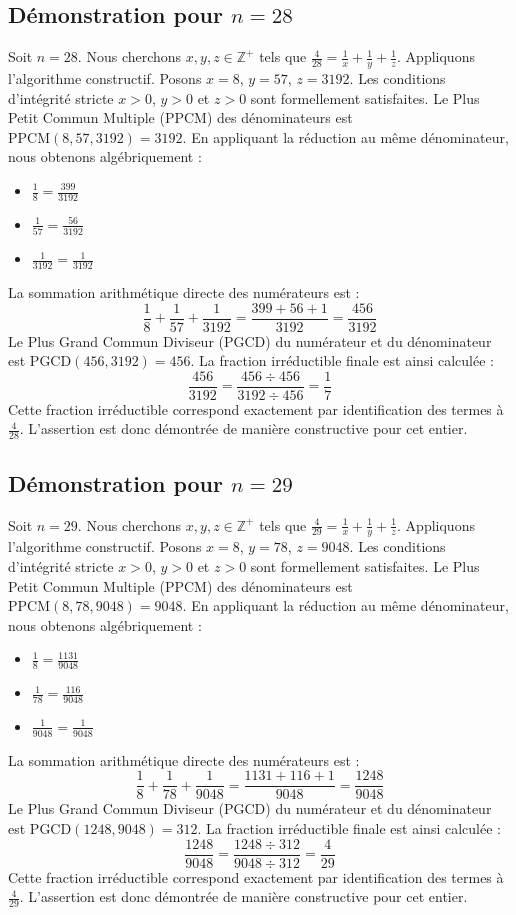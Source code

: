 \documentclass[11pt,a4paper]{article}
\begin{document}
\subsection{Démonstration pour $n = 28$}
Soit $n = 28$. Nous cherchons $x, y, z \in \mathbb{Z}^{+}$ tels que $\frac{4}{28} = \frac{1}{x} + \frac{1}{y} + \frac{1}{z}$.
Appliquons l'algorithme constructif. Posons $x = 8$, $y = 57$, $z = 3192$.
Les conditions d'intégrité stricte $x > 0$, $y > 0$ et $z > 0$ sont formellement satisfaites.
Le Plus Petit Commun Multiple (PPCM) des dénominateurs est $\text{PPCM}(8, 57, 3192) = 3192$.
En appliquant la réduction au même dénominateur, nous obtenons algébriquement :
\begin{itemize}
    \item $\frac{1}{8} = \frac{399}{3192}$
    \item $\frac{1}{57} = \frac{56}{3192}$
    \item $\frac{1}{3192} = \frac{1}{3192}$
\end{itemize}
La sommation arithmétique directe des numérateurs est :
$$ \frac{1}{8} + \frac{1}{57} + \frac{1}{3192} = \frac{399 + 56 + 1}{3192} = \frac{456}{3192} $$
Le Plus Grand Commun Diviseur (PGCD) du numérateur et du dénominateur est $\text{PGCD}(456, 3192) = 456$.
La fraction irréductible finale est ainsi calculée :
$$ \frac{456}{3192} = \frac{456 \div 456}{3192 \div 456} = \frac{1}{7} $$
Cette fraction irréductible correspond exactement par identification des termes à $\frac{4}{28}$. L'assertion est donc démontrée de manière constructive pour cet entier.

\subsection{Démonstration pour $n = 29$}
Soit $n = 29$. Nous cherchons $x, y, z \in \mathbb{Z}^{+}$ tels que $\frac{4}{29} = \frac{1}{x} + \frac{1}{y} + \frac{1}{z}$.
Appliquons l'algorithme constructif. Posons $x = 8$, $y = 78$, $z = 9048$.
Les conditions d'intégrité stricte $x > 0$, $y > 0$ et $z > 0$ sont formellement satisfaites.
Le Plus Petit Commun Multiple (PPCM) des dénominateurs est $\text{PPCM}(8, 78, 9048) = 9048$.
En appliquant la réduction au même dénominateur, nous obtenons algébriquement :
\begin{itemize}
    \item $\frac{1}{8} = \frac{1131}{9048}$
    \item $\frac{1}{78} = \frac{116}{9048}$
    \item $\frac{1}{9048} = \frac{1}{9048}$
\end{itemize}
La sommation arithmétique directe des numérateurs est :
$$ \frac{1}{8} + \frac{1}{78} + \frac{1}{9048} = \frac{1131 + 116 + 1}{9048} = \frac{1248}{9048} $$
Le Plus Grand Commun Diviseur (PGCD) du numérateur et du dénominateur est $\text{PGCD}(1248, 9048) = 312$.
La fraction irréductible finale est ainsi calculée :
$$ \frac{1248}{9048} = \frac{1248 \div 312}{9048 \div 312} = \frac{4}{29} $$
Cette fraction irréductible correspond exactement par identification des termes à $\frac{4}{29}$. L'assertion est donc démontrée de manière constructive pour cet entier.
\end{document}
